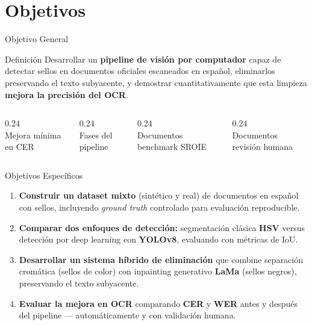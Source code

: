 \documentclass[aspectratio=169, 11pt]{beamer}
\newcommand{\rojo}[1]{\textcolor{PriRed}{#1}}
\begin{document}
\section{Objetivos}

\begin{frame}{Objetivo General}
  \begin{block}{Definición}
    Desarrollar un \textbf{pipeline de visión por computador} capaz de detectar sellos en documentos oficiales escaneados en español, eliminarlos preservando el texto subyacente, y demostrar cuantitativamente que esta limpieza \textbf{mejora la precisión del OCR}.
  \end{block}
  \vspace{14pt}
  \begin{columns}[c]
    \begin{column}{0.24\textwidth}
      \centering{\Large\bfseries\rojo{> 5\%}}\\[4pt]{\scriptsize Mejora mínima en CER}
    \end{column}
    \begin{column}{0.24\textwidth}
      \centering{\Large\bfseries\rojo{6}}\\[4pt]{\scriptsize Fases del pipeline}
    \end{column}
    \begin{column}{0.24\textwidth}
      \centering{\Large\bfseries\rojo{100}}\\[4pt]{\scriptsize Documentos benchmark SROIE}
    \end{column}
    \begin{column}{0.24\textwidth}
      \centering{\Large\bfseries\rojo{25}}\\[4pt]{\scriptsize Documentos revisión humana}
    \end{column}
  \end{columns}
\end{frame}

\begin{frame}{Objetivos Específicos}
  \begin{enumerate}[label=\textbf{\rojo{\arabic*.}}, leftmargin=1.8em, itemsep=10pt]
    \item \textbf{Construir un dataset mixto} (sintético y real) de documentos en español con sellos, incluyendo \textit{ground truth} controlado para evaluación reproducible.
    \item \textbf{Comparar dos enfoques de detección:} segmentación clásica \textbf{HSV} versus detección por deep learning con \textbf{YOLOv8}, evaluando con métricas de IoU.
    \item \textbf{Desarrollar un sistema híbrido de eliminación} que combine separación cromática (sellos de color) con inpainting generativo \textbf{LaMa} (sellos negros), preservando el texto subyacente.
    \item \textbf{Evaluar la mejora en OCR} comparando \textbf{CER} y \textbf{WER} antes y después del pipeline — automáticamente y con validación humana.
  \end{enumerate}
\end{frame}
\end{document}
